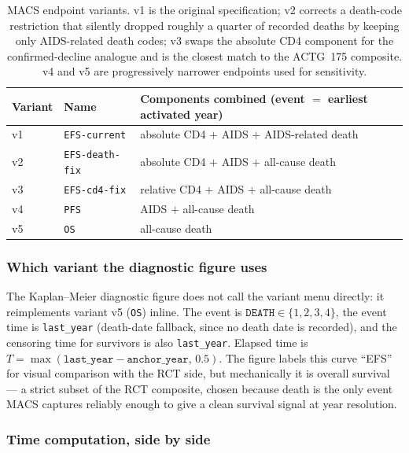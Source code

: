 \documentclass[11pt]{article}
\theoremstyle{plain}
\theoremstyle{definition}
\theoremstyle{remark}
\newcommand{\1}{\mathds{1}}
\begin{document}
\begin{table}[tb]
  \centering
  \small
  \begin{tabular}{@{}lll@{}}
    \toprule
    Variant & Name & Components combined (event $=$ earliest activated year) \\
    \midrule
    v1 & \texttt{EFS-current}   &
        absolute CD4 $+$ AIDS $+$ AIDS-related death \\
    v2 & \texttt{EFS-death-fix} &
        absolute CD4 $+$ AIDS $+$ all-cause death \\
    v3 & \texttt{EFS-cd4-fix}   &
        relative CD4 $+$ AIDS $+$ all-cause death \\
    v4 & \texttt{PFS}           &
        AIDS $+$ all-cause death \\
    v5 & \texttt{OS}            &
        all-cause death \\
    \bottomrule
  \end{tabular}
  \caption{MACS endpoint variants. v1 is the original specification; v2
    corrects a death-code restriction that silently dropped roughly
    a quarter of recorded deaths by keeping only AIDS-related death
    codes; v3 swaps the absolute CD4 component for the
    confirmed-decline analogue and is the closest match to the
    ACTG~175 composite. v4 and v5 are progressively narrower
    endpoints used for sensitivity.}
  \label{tab:variants}
\end{table}

\subsubsection*{Which variant the diagnostic figure uses}

The Kaplan--Meier diagnostic figure does not call the variant menu
directly: it reimplements variant v5 (\texttt{OS}) inline. The event is
$\texttt{DEATH} \in \{1, 2, 3, 4\}$, the event time is
\texttt{last\_year} (death-date fallback, since no death date is
recorded), and the censoring time for survivors is also
\texttt{last\_year}. Elapsed time is
$T = \max(\texttt{last\_year} - \texttt{anchor\_year},\, 0.5)$. The
figure labels this curve ``EFS'' for visual comparison with the RCT
side, but mechanically it is overall survival --- a strict subset of
the RCT composite, chosen because death is the only event MACS
captures reliably enough to give a clean survival signal at year
resolution.

\subsubsection*{Time computation, side by side}
\end{document}
